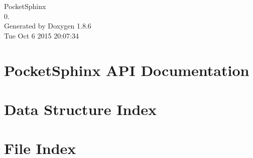 \documentclass[twoside]{book}
\newcommand{\clearemptydoublepage}{%
  \newpage{\pagestyle{empty}\cleardoublepage}%
}
\begin{document}
\begin{titlepage}
\vspace*{7cm}
\begin{center}%
{\Large Pocket\-Sphinx \\[1ex]\large 0. }\\
\vspace*{1cm}
{\large Generated by Doxygen 1.8.6}\\
\vspace*{0.5cm}
{\small Tue Oct 6 2015 20:07:34}\\
\end{center}
\end{titlepage}
\clearemptydoublepage
\tableofcontents
\clearemptydoublepage
{}

\chapter{Pocket\-Sphinx A\-P\-I Documentation}
\label{index}
\chapter{Data Structure Index}

\chapter{File Index}

\end{document}
